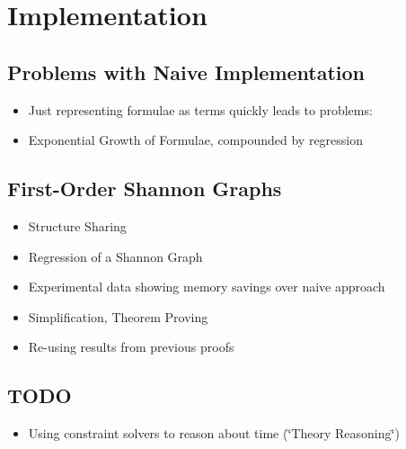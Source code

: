 
\chapter{Implementation}

\label{ch:implementation} %



\section{Problems with Naive Implementation}

\begin{itemize}
\item Just representing formulae as terms quickly leads to problems: 
\item Exponential Growth of Formulae, compounded by regression 
\end{itemize}

\section{First-Order Shannon Graphs}

\begin{itemize}
\item Structure Sharing 
\item Regression of a Shannon Graph 
\item Experimental data showing memory savings over naive approach 
\item Simplification, Theorem Proving 
\item Re-using results from previous proofs 
\end{itemize}

\section{TODO}

\begin{itemize}
\item Using constraint solvers to reason about time (\char`\"{}Theory Reasoning\char`\"{}) 
\end{itemize}

